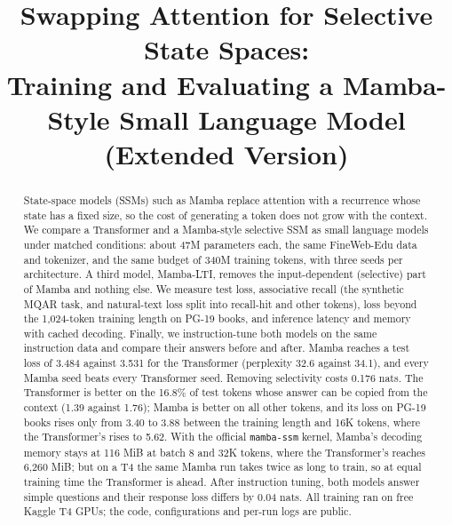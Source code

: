\documentclass[conference]{IEEEtran}
\begin{document}
\title{Swapping Attention for Selective State Spaces:\\
Training and Evaluating a Mamba-Style Small Language Model\\(Extended Version)}

\author{
}

\maketitle

\begin{abstract}
State-space models (SSMs) such as Mamba replace attention with a recurrence whose state has a fixed
size, so the cost of generating a token does not grow with the context. We compare a Transformer and a
Mamba-style selective SSM as small language models under matched conditions: about 47M parameters
each, the same FineWeb-Edu data and tokenizer, and the same budget of 340M training tokens, with three
seeds per architecture. A third model, Mamba-LTI, removes the input-dependent (selective) part of Mamba
and nothing else. We measure test loss, associative recall (the synthetic MQAR task, and natural-text
loss split into recall-hit and other tokens), loss beyond the 1,024-token training length on PG-19
books, and inference latency and memory with cached decoding. Finally, we instruction-tune both models
on the same instruction data and compare their answers before and after.
Mamba reaches a test loss of 3.484 against 3.531 for the Transformer (perplexity 32.6 against 34.1), and
every Mamba seed beats every Transformer seed. Removing selectivity costs 0.176 nats. The Transformer is
better on the 16.8\% of test tokens whose answer can be copied from the context (1.39 against 1.76);
Mamba is better on all other tokens, and its loss on PG-19 books rises only from 3.40 to 3.88 between
the training length and 16K tokens, where the Transformer's rises to 5.62. With the official
\texttt{mamba-ssm} kernel, Mamba's decoding memory stays at 116 MiB at batch 8 and 32K tokens, where
the Transformer's reaches 6,260 MiB; but on a T4 the same Mamba run takes twice as long to train, so
at equal training time the Transformer is ahead. After instruction tuning, both models answer simple
questions and their response loss differs by 0.04 nats. All training ran on free Kaggle T4 GPUs; the
code, configurations and per-run logs are public.
\end{abstract}
\end{document}
